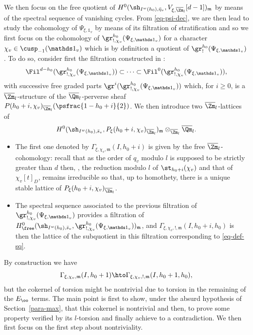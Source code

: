 We then focus on the free quotient of
$H^0(\sh_{I^w(h_0),\bar \eta_v},V_{\xi,\overline \Zm_l}[d-1])_{\mathfrak m}$
by means of the spectral sequence of vanishing cycles. From \eqref{eq-psi-dec},
we are then lead to study the cohomology of $\Psi_{\xi,\mathds 1_v}$
by means of its filtration of stratification and so we first focus
on the cohomology of $\gr^{h_0}_{!,\chi_v}(\Psi_{\xi,\mathds 1_v})$ for a character
$\chi_v \in \cusp_{-1}(\mathds 1_v)$ which is by definition a quotient of
$\gr^{h_0}_{!}(\Psi_{\xi,\mathds 1_v})$.
To do so, consider first the filtration constructed in \cite{boyer-torsion}:
\[
\Fil^{d-h_0} (\gr^{h_0}_{!,\chi_v}(\Psi_{\xi,\mathds 1_v})) \subset
\cdots \subset \Fil^0(\gr^{h_0}_{!,\chi_v}(\Psi_{\xi,\mathds 1_v})),
\]
with successive free graded parts
$\gr^i(\gr^{h_0}_{!,\chi_v}(\Psi_{\xi,\mathds 1_v}))$ which, for $i \geq 0$,
is a $\overline \Zm_l$-structure of
the $\overline \Qm_l$-perverse sheaf $P(h_0+i,\chi_v)_{\overline \Zm_l}(\psfrac{1-h_0+i}{2})$.
We then introduce two $\overline \Zm_l$-lattices of
\begin{equation} \label{eq-def-sq}
H^0(\sh_{I^w(h_0),\bar s_v},P_\xi(h_0+i,\chi_v)_{\overline \Zm_l})_{\mathfrak m}
\otimes_{\overline \Zm_l} \overline \Qm_l.
\end{equation}
\begin{itemize}
\item The first one denoted by $\Gamma_{\xi,\chi_v,\mathfrak m}(I,h_0+i)$ is given by the free $\overline \Zm_l$-cohomology: recall that as the order of $q_v$
modulo $l$
is supposed to be strictly greater than $d$ then, \cf \cite{boyer-repmodl},
the reduction modulo $l$ of
$\st_{h_0+i}(\chi_v)$ and that of $\chi_v[t]_D$,
remains irreducible so that, up to homothety, there is a unique
stable lattice of $P_\xi(h_0+i,\chi_v)_{\overline \Zm_l}$.

\item The spectral sequence associated to the previous filtration of
$\gr^{h_0}_{!,\chi_v}(\Psi_{\xi,\mathds 1_v})$ provides a filtration of $H^0_{\free}
(\sh_{I^w(h_0),\bar s_v},\gr^{h_0}_{!,\chi_v}(\Psi_{\xi,\mathds 1_v}))_{\mathfrak m}$,
and $\Gamma_{\xi,\chi_v,!,\mathfrak m}(I,h_0+i,h_0)$ is then the lattice of the
subquotient in this filtration corresponding to \eqref{eq-def-sq}.
\end{itemize}

By construction we have\vspace*{-3pt}
\begin{equation} \label{eq-T}
\Gamma_{\xi,\chi_v,\mathfrak m}(I,h_0+1)
\hto \Gamma_{\xi,\chi_v,!,\mathfrak m}(I,h_0+1,h_0),
\end{equation}
but the cokernel of torsion might be nontrivial due to torsion
in the remaining of the $E_\oo$ terms. The main point is first to show,
under the absurd hypothesis of Section~\ref{para-max}, that this cokernel is nontrivial and
then, to prove some property verified by its $l$\nobreakdash-tor\-sion and finally achieve to a
contradiction. We then first focus on the first step about nontriviality.

